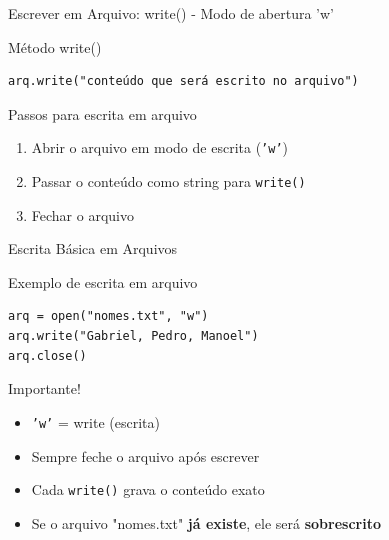 \begin{frame}[fragile]{Escrever em Arquivo: write() - Modo de abertura 'w'}

    \begin{block}{Método write()}
        \begin{verbatim}
arq.write("conteúdo que será escrito no arquivo")
\end{verbatim}
    \end{block}

    \begin{block}{Passos para escrita em arquivo}
        \begin{enumerate}
            \item Abrir o arquivo em modo de escrita (\texttt{'w'})
            \item Passar o conteúdo como string para \texttt{write()}
            \item Fechar o arquivo
        \end{enumerate}
    \end{block}

\end{frame}

\begin{frame}[fragile]{Escrita Básica em Arquivos}
    \begin{block}{Exemplo de escrita em arquivo}
        \begin{verbatim}
arq = open("nomes.txt", "w")
arq.write("Gabriel, Pedro, Manoel")
arq.close()
\end{verbatim}
    \end{block}

    \begin{block}{Importante!}
        \begin{itemize}
            \item \texttt{'w'} = write (escrita)
            \item Sempre feche o arquivo após escrever
            \item Cada \texttt{write()} grava o conteúdo exato
            \item Se o arquivo "nomes.txt" \textbf{já existe}, ele será \textbf{sobrescrito}
        \end{itemize}
    \end{block}
\end{frame}

